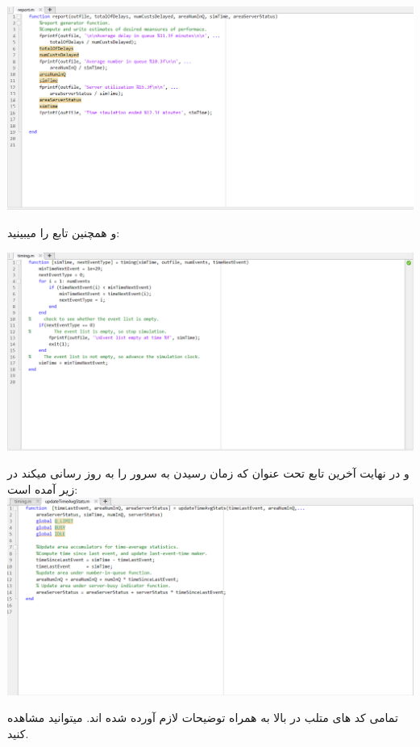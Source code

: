 \documentclass[12pt,a4paper]{report}
\begin{document}
	\includegraphics[scale=0.6]{Figures/R}
	
	و همچنین تابع 
	را میبینید:
	
	\includegraphics[scale=0.6]{Figures/T}
	
	\pagebreak
	
	و در نهایت آخرین تابع تحت عنوان
	که زمان رسیدن به سرور را به روز رسانی میکند در زیر آمده است:
	\\
	\includegraphics[scale=0.6]{Figures/U}
	
	
	
	تمامی کد های متلب در بالا به همراه توضیحات لازم آورده شده اند. میتوانید مشاهده کنید. 
	
	
	
\end{document}
